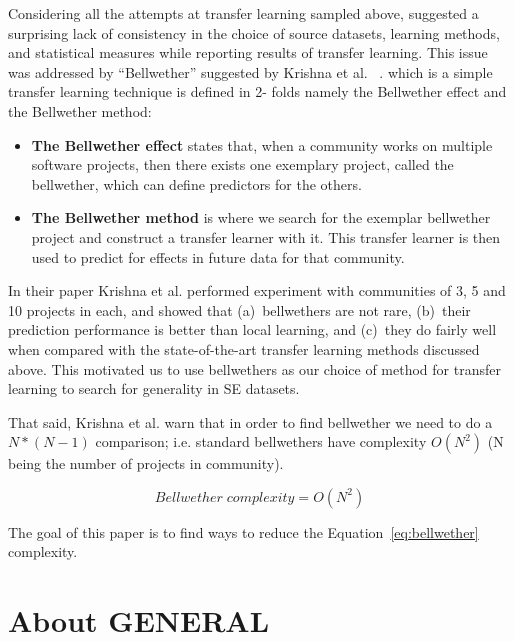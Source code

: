 \documentclass[10pt,journal,compsoc]{IEEEtran}
\newcommand{\bi}{\begin{itemize}}
\newcommand{\ei}{\end{itemize}}
\begin{document}
Considering all the attempts at transfer learning sampled above, suggested a surprising lack of consistency in the choice of source datasets, learning methods, and statistical measures while reporting results of transfer learning. This issue was addressed by ``Bellwether'' suggested by Krishna et al. ~\cite{krishna2017simpler,krishna16}. which is a simple transfer learning technique is defined in 2- folds namely the Bellwether effect and the Bellwether method:

\bi

    \item \textbf{The Bellwether effect} states that, when a community works on multiple software projects,  then there exists one exemplary project, called the bellwether, which can define predictors for the others.
    
    \item \textbf{The Bellwether method} is where we search for the exemplar bellwether project and construct a transfer learner with it. This transfer learner is then used to predict for effects in future data for that community.

\ei

In their paper Krishna et al. performed experiment with communities of 3, 5 and 10 projects in each, and showed that (a)~bellwethers are not rare, (b)~their prediction performance is better than local learning, and (c)~they do fairly well when compared with 
the state-of-the-art transfer learning methods discussed above.
This motivated us to use  bellwethers as our choice of method for transfer learning to search for generality in SE datasets. 

That said,  Krishna et al. warn that in order to find bellwether we need to do a $ N*(N-1) $ comparison; i.e. standard bellwethers
have complexity $ O(N^2) $ (N being the number of projects in community). 

\begin{equation}
\label{eq:bellwether}
    \mathit{Bellwether\; complexity } = O(N^2)
\end{equation}

The goal of this paper is to find ways to reduce the Equation~\ref{eq:bellwether} complexity.




 
\section{About GENERAL}
\label{GENERAL}
\end{document}
